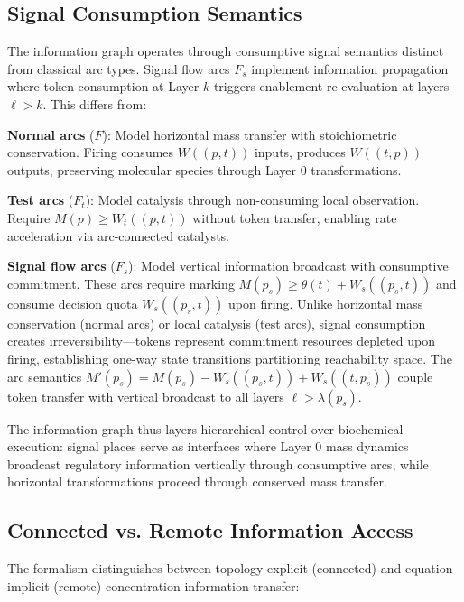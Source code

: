 \documentclass[10pt,letterpaper]{article}
\begin{document}
\subsection{Signal Consumption Semantics}

The information graph operates through consumptive signal semantics distinct from classical arc types. Signal flow arcs $F_s$ implement information propagation where token consumption at Layer $k$ triggers enablement re-evaluation at layers $\ell > k$. This differs from:

\textbf{Normal arcs} ($F$): Model horizontal mass transfer with stoichiometric conservation. Firing consumes $W((p,t))$ inputs, produces $W((t,p))$ outputs, preserving molecular species through Layer 0 transformations.

\textbf{Test arcs} ($F_t$): Model catalysis through non-consuming local observation. Require $M(p) \geq W_t((p,t))$ without token transfer, enabling rate acceleration via arc-connected catalysts.

\textbf{Signal flow arcs} ($F_s$): Model vertical information broadcast with consumptive commitment. These arcs require marking
$M(p_s) \geq \theta(t) + W_s((p_s,t))$
and consume decision quota $W_s((p_s,t))$ upon firing. Unlike horizontal mass conservation (normal arcs) or local catalysis (test arcs), signal consumption creates irreversibility---tokens represent commitment resources depleted upon firing, establishing one-way state transitions partitioning reachability space. The arc semantics
$M'(p_s) = M(p_s) - W_s((p_s,t)) + W_s((t,p_s))$
couple token transfer with vertical broadcast to all layers $\ell > \lambda(p_s)$.

The information graph thus layers hierarchical control over biochemical execution: signal places serve as interfaces where Layer 0 mass dynamics broadcast regulatory information vertically through consumptive arcs, while horizontal transformations proceed through conserved mass transfer.

\subsection{Connected vs. Remote Information Access}

The formalism distinguishes between topology-explicit (connected) and equation-implicit (remote) concentration information transfer:
\end{document}
